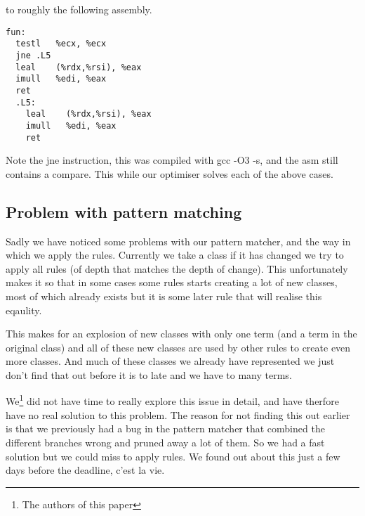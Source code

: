 to roughly the following assembly. 
\begin{verbatim}
fun:                                                                                 
  testl   %ecx, %ecx                                                               
  jne .L5                                                                          
  leal    (%rdx,%rsi), %eax                                                        
  imull   %edi, %eax                                                               
  ret                                                                              
  .L5:                                                                                 
    leal    (%rdx,%rsi), %eax                                                        
    imull   %edi, %eax                                                               
    ret                                                                              
\end{verbatim}
Note the jne instruction, this was
compiled with gcc -O3 -s, and the asm still contains a compare.
This while our optimiser solves each of the above cases.

\subsection{Problem with pattern matching}

Sadly we have noticed some problems with our pattern matcher, and the way in which
we apply the rules. Currently we take a class if it has changed we try to apply
all rules (of depth that matches the depth of change). This unfortunately makes it
so that in some cases some rules starts creating a lot of new classes, most of which 
already exists but it is some later rule that will realise this eqaulity.

This makes for an explosion of new classes with only one term (and a term in the
original class) and all of these new classes are used by other rules to create even
more classes. And much of these classes we already have represented we just don't
find that out before it is to late and we have to many terms.

We\footnote{The authors of this paper} did not have time to really explore 
this issue in detail, and have therfore have
no real solution to this problem. The reason for not finding this out earlier is
that we previously had a bug in the pattern matcher that combined the different branches
wrong and pruned away a lot of them. So we had a fast solution but we could miss
to apply rules. We found out about this just a few days before the deadline, c'est
la vie.

